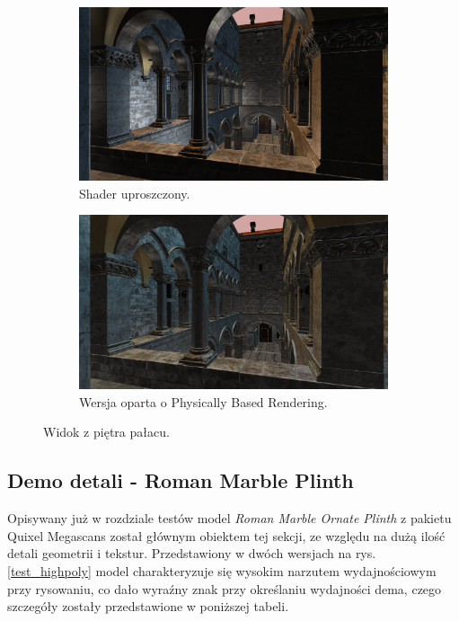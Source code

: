 \begin{figure}[h!]
	\begin{subfigure}{.5\textwidth}
		\centering
		\includegraphics[width=\textwidth]{images/demo_sponza_4.png}
		\caption{Shader uproszczony.}
	\end{subfigure}
	\begin{subfigure}{.5\textwidth}
		\centering
		\includegraphics[width=\textwidth]{images/demo_sponza_4_pbr.png}
		\caption{Wersja oparta o Physically Based Rendering.}
	\end{subfigure}
	\caption{Widok z piętra pałacu.}
	\label{test_sponza_3}
\end{figure}

\vfill
\clearpage

\subsection{Demo detali - Roman Marble Plinth}
Opisywany już w rozdziale testów model \textit{Roman Marble Ornate Plinth} z pakietu Quixel Megascans został głównym obiektem tej sekcji, ze względu na dużą ilość detali geometrii i tekstur. Przedstawiony w dwóch wersjach na rys. \ref{test_highpoly} model charakteryzuje się wysokim narzutem wydajnościowym przy rysowaniu, co dało wyraźny znak przy określaniu wydajności dema, czego szczegóły zostały przedstawione w poniższej tabeli.

